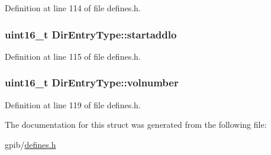 Definition at line 114 of file defines.\+h.

\subsubsection[{\texorpdfstring{startaddlo}{startaddlo}}]{\setlength{\rightskip}{0pt plus 5cm}uint16\+\_\+t Dir\+Entry\+Type\+::startaddlo}\hypertarget{structDirEntryType_aea0e798bb172b4bddf174ce339a4a54a}{}\label{structDirEntryType_aea0e798bb172b4bddf174ce339a4a54a}


Definition at line 115 of file defines.\+h.

\subsubsection[{\texorpdfstring{volnumber}{volnumber}}]{\setlength{\rightskip}{0pt plus 5cm}uint16\+\_\+t Dir\+Entry\+Type\+::volnumber}\hypertarget{structDirEntryType_add9ab11f89586efb100471f6580e75c5}{}\label{structDirEntryType_add9ab11f89586efb100471f6580e75c5}


Definition at line 119 of file defines.\+h.



The documentation for this struct was generated from the following file\+:\begin{DoxyCompactItemize}
\item 
gpib/\hyperlink{defines_8h}{defines.\+h}\end{DoxyCompactItemize}
